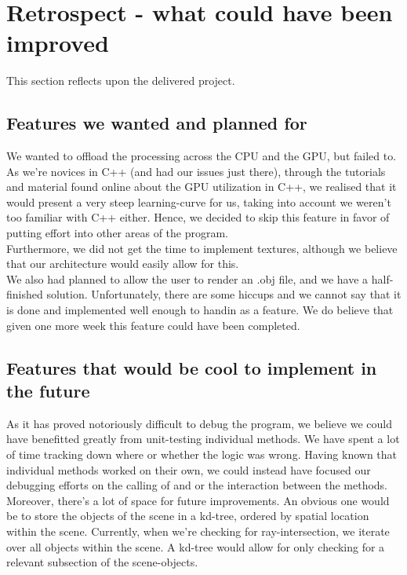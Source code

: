 \section{Retrospect - what could have been improved}
This section reflects upon the delivered project. 

\subsection{Features we wanted and planned for}
We wanted to offload the processing across the CPU and the GPU, but failed to. As we’re novices in C++ (and had our issues just there), through the tutorials and material found online about the GPU utilization in C++, we realised that it would present a very steep learning-curve for us, taking into account we weren’t too familiar with C++ either. Hence, we decided to skip this feature in favor of putting effort into other areas of the program.\\

Furthermore, we did not get the time to implement textures, although we believe that our architecture would easily allow for this. \\

We also had planned to allow the user to render an .obj file, and we have a half-finished solution. Unfortunately, there are some hiccups and we cannot say that it is done and implemented well enough to handin as a feature. We do believe that given one more week this feature could have been completed. \\

\subsection{Features that would be cool to implement in the future}
As it has proved notoriously difficult to debug the program, we believe we could have benefitted greatly from unit-testing individual methods. We have spent a lot of time tracking down where or whether the logic was wrong. Having known that individual methods worked on their own, we could instead have focused our debugging efforts on the calling of and or the interaction between the methods.\\

Moreover, there’s a lot of space for future improvements. An obvious one would be to store the objects of the scene in a kd-tree, ordered by spatial location within the scene. Currently, when we’re checking for ray-intersection, we iterate over all objects within the scene. A kd-tree would allow for only checking for a relevant subsection of the scene-objects. \\

